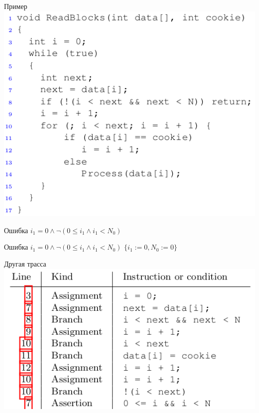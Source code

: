 \documentclass{beamer}
\begin{document}
\begin{frame}{Пример}
\includegraphics[scale=0.5]{example1.png}
\end{frame}

\begin{frame}{Ошибка}
$i_1 = 0 \wedge \lnot (0 \le i_1 \wedge i_1 < N_0)$\newline
\end{frame}

\begin{frame}{Ошибка}
$i_1 = 0 \wedge \lnot (0 \le i_1 \wedge i_1 < N_0)$\newline
$\{i_1 := 0, N_0 := 0\}$
\end{frame}

\begin{frame}{Другая трасса}
\includegraphics[scale=0.5]{trace2.png}
\end{frame}
\end{document}
